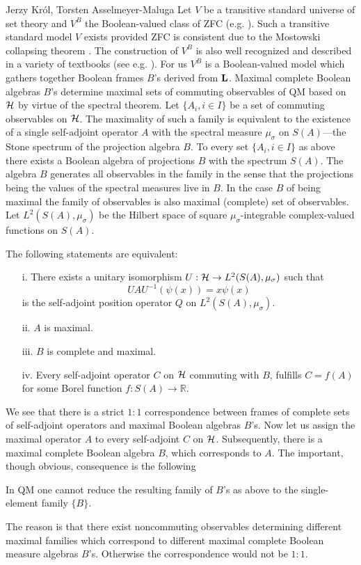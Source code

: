 \begin{artengenv2auth}{Jerzy Kr\'ol, Torsten Asselmeyer-Maluga}
Let $V$ be a transitive standard universe of set theory and $V^B$ the Boolean-valued class of ZFC (e.g. \cite{Jech2003}). Such a transitive standard model $V$ exists provided ZFC is consistent due to the Mostowski collapsing theorem \parencite{Jech2003}. The construction of $V^B$ is also well recognized and described in a variety of textbooks (see e.g. \cite{Jech2003,Bell2005}). For us $V^B$ is a Boolean-valued model which gathers together Boolean frames $B$'s derived from ${\bf L}$. Maximal complete Boolean algebras $B$'s determine maximal sets of commuting observables of QM based on ${\cal H}$ by virtue of the spectral theorem. Let $\{A_i,i\in I\}$ be a set of commuting observables on ${\cal H}$. The maximality of such a family is equivalent to the existence of a single self-adjoint operator $A$ with the spectral measure $\mu_{\sigma}$ on $S(A)$---the Stone spectrum of the projection algebra $B$. To every set $\{A_i,i\in I\}$ as above there exists a Boolean algebra of projections $B$ with the spectrum $S(A)$. The algebra $B$ generates all observables in the family in the sense that the projections being the values of the spectral measures live in $B$. In the case $B$ of being maximal the family of observables is also maximal (complete) set of observables. Let $L^2(S(A),\mu_{\sigma})$ be the Hilbert space of square $\mu_{\sigma}$-integrable complex-valued functions on $S(A)$. 
\begin{Lemma}\parencite{Boos1996}
The following statements are equivalent:
\begin{itemize}
    \item[i.] There exists a unitary isomorphism $U:{\cal H}\to L^2(S(A),\mu_{\sigma})$ such that 
    \[UAU^{-1}(\psi(x))=x\psi(x)
    \] is the self-adjoint position operator $Q$ on $L^2(S(A),\mu_{\sigma})$.
\item[ii.]  $A$ is maximal.
\item[iii.] $B$ is complete and maximal.
\item[iv.] Every self-adjoint operator $C$ on ${\cal H}$ commuting with $B$, fulfills $C=f(A)$ for some Borel function $f:S(A)\to \mathbb{R}$.
\end{itemize}
\end{Lemma}
We see that there is a strict $1:1$ correspondence between frames of complete sets of self-adjoint operators and maximal Boolean algebras $B$'s. Now let us assign the maximal operator $A$ to every self-adjoint $C$ on ${\cal H}$.
Subsequently, there is a maximal complete Boolean algebra $B$, which corresponds to $A$.
The important, though obvious, consequence is the following
\begin{Corollary}\label{corr1}
In QM one cannot reduce the resulting family of $B$'s as above to the single-element family $\{B\}$.
\end{Corollary}
The reason is that there exist noncommuting observables determining different maximal families which correspond to different maximal complete Boolean measure algebras $B$'s. Otherwise the correspondence would not be $1:1$.


\end{artengenv2auth}
